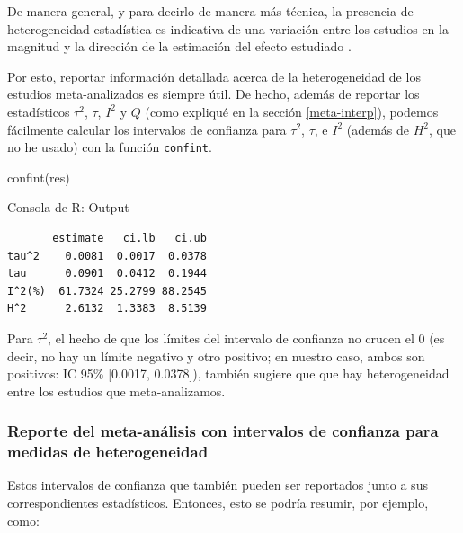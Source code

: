 \documentclass[
  bookmarksnumbered]{article}
\newenvironment{Shaded}{\begin{snugshade}}{\end{snugshade}}
\newcommand{\FunctionTok}[1]{\textcolor[rgb]{0.39,0.29,0.61}{#1}}
\newcommand{\NormalTok}[1]{\textcolor[rgb]{0.12,0.11,0.11}{#1}}
\begin{document}
De manera general, y para decirlo de manera más técnica, la presencia de heterogeneidad estadística es indicativa de una variación entre los estudios en la magnitud y la dirección de la estimación del efecto estudiado \autocite[para más información y ejemplos, ver][]{sedgwickMetaanalysesWhatHeterogeneity2015}.

Por esto, reportar información detallada acerca de la heterogeneidad de los estudios meta-analizados es siempre útil. De hecho, además de reportar los estadísticos \(\tau^2\), \(\tau\), \(I^2\) y \(Q\) (como expliqué en la sección \ref{meta-interp}), podemos fácilmente calcular los intervalos de confianza para \(\tau^2\), \(\tau\), e \(I^2\) (además de \(H^2\), que no he usado) con la función \texttt{confint}.

\begin{Shaded}
\begin{Highlighting}[]
\FunctionTok{confint}\NormalTok{(res)}
\end{Highlighting}
\end{Shaded}

\begin{ROut}{Consola de R: Output~\thetcbcounter}
                \begin{footnotesize}
                \begin{verbatim} 
       estimate   ci.lb   ci.ub 
tau^2    0.0081  0.0017  0.0378 
tau      0.0901  0.0412  0.1944 
I^2(%)  61.7324 25.2799 88.2545 
H^2      2.6132  1.3383  8.5139 
 \end{verbatim}
                \end{footnotesize}
                \end{ROut}

Para \(\tau^2\), el hecho de que los límites del intervalo de confianza no crucen el 0 (es decir, no hay un límite negativo y otro positivo; en nuestro caso, ambos son positivos: IC 95\% {[}0.0017, 0.0378{]}), también sugiere que que hay heterogeneidad entre los estudios que meta-analizamos.

\hypertarget{reporte2}{%
\subsubsection{Reporte del meta-análisis con intervalos de confianza para medidas de heterogeneidad}\label{reporte2}}

Estos intervalos de confianza que también pueden ser reportados junto a sus correspondientes estadísticos. Entonces, esto se podría resumir, por ejemplo, como:
\end{document}
